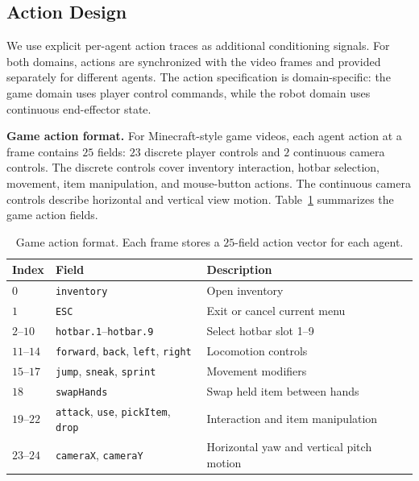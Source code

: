 \documentclass{llmxive}
\providecommand{\arraystretch}{1.12}
\begin{document}
\subsection{Action Design}
\label{app:action-design}

We use explicit per-agent action traces as additional conditioning signals.
For both domains, actions are synchronized with the video frames and provided separately for different agents.
The action specification is domain-specific: the game domain uses player control commands, while the robot domain uses continuous end-effector state.

\noindent\textbf{Game action format.}
For Minecraft-style game videos, each agent action at a frame contains $25$ fields: $23$ discrete player controls and $2$ continuous camera controls.
The discrete controls cover inventory interaction, hotbar selection, movement, item manipulation, and mouse-button actions.
The continuous camera controls describe horizontal and vertical view motion.
Table~\ref{tab:game-action-format} summarizes the game action fields.

\begin{table}[t]
  \centering
  \footnotesize
  \vspace{4pt}
  \setlength{\tabcolsep}{4pt}
  \renewcommand{\arraystretch}{1.12}
  \begin{tabular}{@{}lll@{}}
    \toprule
    \textbf{Index} & \textbf{Field} & \textbf{Description} \\
    \midrule
    $0$ & \texttt{inventory} & Open inventory \\
    $1$ & \texttt{ESC} & Exit or cancel current menu \\
    $2$--$10$ & \texttt{hotbar.1}--\texttt{hotbar.9} & Select hotbar slot 1--9 \\
    $11$--$14$ & \texttt{forward}, \texttt{back}, \texttt{left}, \texttt{right} & Locomotion controls \\
    $15$--$17$ & \texttt{jump}, \texttt{sneak}, \texttt{sprint} & Movement modifiers \\
    $18$ & \texttt{swapHands} & Swap held item between hands \\
    $19$--$22$ & \texttt{attack}, \texttt{use}, \texttt{pickItem}, \texttt{drop} & Interaction and item manipulation \\
    $23$--$24$ & \texttt{cameraX}, \texttt{cameraY} & Horizontal yaw and vertical pitch motion \\
    \bottomrule
  \end{tabular}
\caption{Game action format. Each frame stores a $25$-field action vector for each agent.}
\label{tab:game-action-format}
\end{table}
\end{document}
